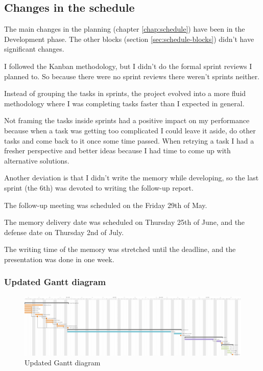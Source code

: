 \subsection{Changes in the schedule}

The main changes in the planning (chapter \ref{chap:schedule}) have been in the Development phase. The other blocks (section \ref{sec:schedule-blocks}) didn't have significant changes.

I followed the Kanban methodology, but I didn't do the formal sprint reviews I planned to. So because there were no sprint reviews there weren't sprints neither. 

Instead of grouping the tasks in sprints, the project evolved into a more fluid methodology where I was completing tasks faster than I expected in general.

Not framing the tasks inside sprints had a positive impact on my performance because when a task was getting too complicated I could leave it aside, do other tasks and come back to it once some time passed. When retrying a task I had a fresher perspective and better ideas because I had time to come up with alternative solutions.

Another deviation is that I didn't write the memory while developing, so the last sprint (the 6th) was devoted to writing the follow-up report.

The follow-up meeting was scheduled on the Friday 29th of May.

The memory delivery date was scheduled on Thursday 25th of June, and the defense date on Thursday 2nd of July.

The writing time of the memory was stretched until the deadline, and the presentation was done in one week.

\newpage
\subsubsection{Updated Gantt diagram}

\begin{figure}[ht!]
    \center
    \includegraphics[width=\textheight-79pt,angle=90]{media/diagrams/gantt2.pdf}
    \caption{Updated Gantt diagram}
    \label{updated-gantt}
\end{figure}
